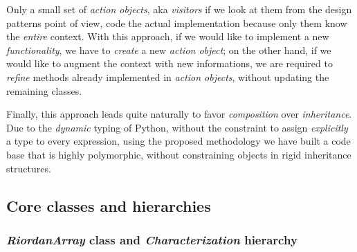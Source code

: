 Only a small set of \emph{action objects}, aka \emph{visitors} if we look
at them from the design patterns \cite{Gamma:1995:DPE:186897} point of view,
code the actual implementation because only them know the \emph{entire}
context.  With this approach, if we would like to implement a new
\emph{functionality}, we have to \emph{create} a new \emph{action object}; on
the other hand, if we would like to augment the context with new informations,
we are required to \emph{refine} methods already implemented in \emph{action
objects}, without updating the remaining classes.

Finally, this approach leads quite naturally to favor \emph{composition} over
\emph{inheritance}. Due to the \emph{dynamic} typing of Python, without the
constraint to assign \emph{explicitly} a type to every expression, using the
proposed methodology we have built a code base that is highly polymorphic,
without constraining objects in rigid inheritance structures.

\subsection{Core classes and hierarchies}

\subsubsection{\emph{RiordanArray} class and \emph{Characterization} hierarchy}


